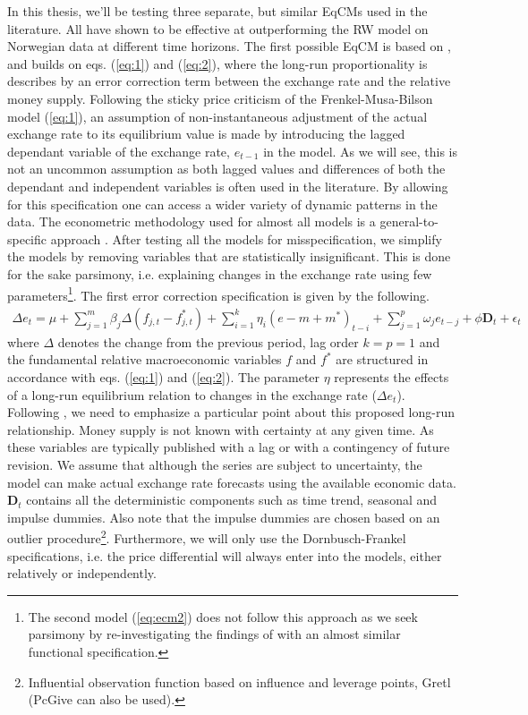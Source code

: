 \documentclass[10pt]{article}
\numberwithin{equation}{section}
\numberwithin{table}{section}
\numberwithin{figure}{section}
\begin{document}
\begin{spacing}{1.5}
\indent In this thesis, we'll be testing three separate, but similar EqCMs used in the literature. All have shown to be effective at outperforming the RW model on Norwegian data at different time horizons. The first possible EqCM is based on \cite{reinton1999out}, and builds on eqs. (\ref{eq:1}) and (\ref{eq:2}), where the long-run proportionality is describes by an error correction term between the exchange rate and the relative money supply. Following the sticky price criticism of the Frenkel-Musa-Bilson model (\ref{eq:1}), an assumption of non-instantaneous adjustment of the actual exchange rate to its equilibrium value is made by introducing the lagged dependant variable of the exchange rate, $e_{t-1}$ in the model. As we will see, this is not an uncommon assumption as both lagged values and differences of both the dependant and independent variables is often used in the literature. By allowing for this specification one can access a wider variety of dynamic patterns in the data.  The econometric methodology used for almost all models is a general-to-specific approach \citep{krolzig2001computer}. After testing all the models for misspecification, we simplify the models by removing variables that are statistically insignificant. This is done for the sake parsimony, i.e. explaining changes in the exchange rate using few parameters\footnote{The second model (\ref{eq:ecm2}) does not follow this approach as we seek parsimony by re-investigating the findings of \cite{bjornland2006importance} with an almost similar functional specification.}. The first error correction specification is given by the following.   
\begin{align}
    \Delta e_t = \mu + \sum_{j=1}^m \beta_j \Delta (f_{j,t}-f_{j,t}^*) + \sum_{i=1}^k \eta_{i} \left(e - m + m^* \right)_{t-i} + \sum_{j=1}^p \omega_j e_{t-j} + \phi \mathbf{D}_t + \epsilon_t
    \label{eq:ecm1}
\end{align}
where $\Delta$ denotes the change from the previous period, lag order $k = p = 1$ and the fundamental relative macroeconomic variables $f$ and $f^*$ are structured in accordance with eqs. (\ref{eq:1}) and (\ref{eq:2}). The parameter $\eta$ represents the effects of a long-run equilibrium relation to changes in the exchange rate ($\Delta e_t$). Following \cite{reinton1999out}, we need to emphasize a particular point about this proposed long-run relationship. Money supply is not known with certainty at any given time. As these variables are typically published with a lag or with a contingency of future revision. We assume that although the series are subject to uncertainty, the model can make actual exchange rate forecasts using the available economic data. $\mathbf{D}_t$ contains all the deterministic components such as time trend, seasonal and impulse dummies. Also note that the impulse dummies are chosen based on an outlier procedure\footnote{Influential observation function based on influence and leverage points, Gretl (PcGive can also be used).}. Furthermore, we will only use the Dornbusch-Frankel specifications, i.e. the price differential will always enter into the models, either relatively or independently.\\

\end{spacing}
\end{document}
